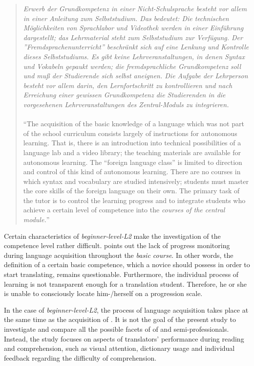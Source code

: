 \documentclass[output=paper]{langsci/langscibook.cls}
\begin{document}
\begin{quote}
\textit{%
Erwerb der Grundkompetenz in einer Nicht-Schulsprache besteht vor allem in einer Anleitung zum Selbststudium. Das bedeutet: Die technischen Möglich\-kei\-ten von Sprachlabor und Videothek werden in einer Einführung dargestellt; das Lehrmaterial steht zum Selbststudium zur Verfügung. Der \textsf{''Fremdsprachenunterricht''} beschränkt sich auf eine Lenkung und Kontrolle dieses Selbststudiums. Es gibt keine Lehrveranstaltungen, in denen Syntax und Vokabeln gepaukt werden; die fremdsprachliche Grundkompetenz soll und muß der Studierende sich selbst aneignen. Die Aufgabe der Lehrperson besteht vor allem darin, den Lernfortschritt zu kontrollieren und nach Erreichung einer gewissen Grundkompetenz die Studierenden in die vorgesehenen Lehrveranstaltungen des Zentral-Moduls zu integrieren.
}\hfill\citep[167]{Honig1995}
\\\\
``The acquisition of the basic knowledge of a language which was not part of the school curriculum consists largely of instructions for autonomous learning.  That is, there is an introduction into technical possibilities of a language lab and a video library; the teaching materials are available for autonomous learning. The ``foreign language class'' is limited to direction and control of this kind of autonomous learning. There are no courses in which syntax and vocabulary are studied intensively; students must master the core skills of the foreign language on their own. The primary task of the tutor is to control the learning progress and to integrate students who achieve a certain level of competence into the \textit{courses of the central module.}''
\end{quote}


Certain characteristics of \textit{beginner-level-L2} make the investigation of the competence level rather difficult. \citet{PruferLeske1997} points out the lack of progress monitoring during language acquisition throughout the \textit{basic course}. In other words, the definition of a certain basic competence, which a novice should possess in order to start translating, remains questionable. Furthermore, the individual process of learning is not transparent enough for a translation student. Therefore, he or she is unable to consciously locate him-/herself on a progression scale.


In the case of \textit{beginner-level-L2}, the process of language acquisition takes place at the same time as the acquisition of . It is not the goal of the present study to investigate and compare all the possible facets of  of  and semi-professionals. Instead, the study focuses on aspects of translators' performance during reading and comprehension, such as visual attention, dictionary usage and individual feedback regarding the difficulty of comprehension. 
\end{document}
